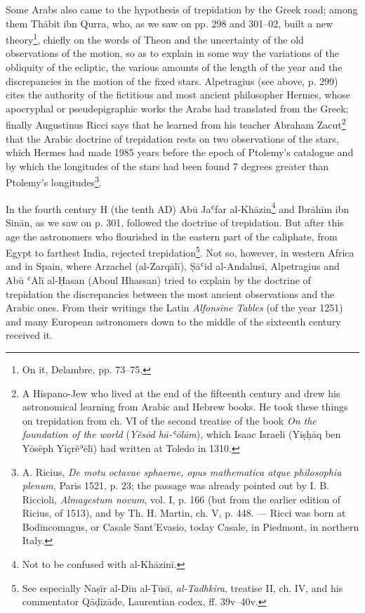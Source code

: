 \documentclass[11pt]{article}
\newcommand{\Pg}[1]{\marginpar{\footnotesize\color{gray}#1}}
\begin{document}
\par Some Arabs also came to the hypothesis of trepidation by the Greek road; among them Thābit ibn Qurra, who, as we saw on pp. 298 and 301–02, built a new theory\footnote{On it, Delambre, pp. 73–75.}, chiefly on the words of Theon and the uncertainty of the old observations of the motion, so as to explain in some way the variations of the obliquity of the ecliptic, the various amounts of the length of the year and the discrepancies in the motion of the fixed stars. Alpetragius (see above, p. 299) cites the authority of the fictitious and most ancient philosopher Hermes, whose apocryphal or pseudepigraphic works the Arabs had translated from the Greek; finally Augustinus Ricci says that he learned from his teacher Abraham Zacut\footnote{A Hispano-Jew who lived at the end of the fifteenth century and drew his astronomical learning from Arabic and Hebrew books. He took these things on trepidation from ch. VI of the second treatise of the book \emph{On the foundation of the world} (\emph{Yĕsōd hā-ʿōlām}), which Isaac Israeli (Yiṣḥāq ben Yōsēph Yiçrĕʾēlī) had written at Toledo in 1310.} that the Arabic doctrine of trepidation rests on two observations of the stars, which Hermes had made 1985 years before the epoch of Ptolemy's catalogue and by which the longitudes of the stars had been found 7 degrees greater than Ptolemy's longitudes\footnote{A. Ricius, \emph{De motu octavae sphaerae, opus mathematica atque philosophia plenum}, Paris 1521, p. 23; the passage was already pointed out by I. B. Riccioli, \emph{Almagestum novum}, vol. I, p. 166 (but from the earlier edition of Ricius, of 1513), and by Th. H. Martin, ch. V, p. 448. — Ricci was born at Bodincomagus, or Casale Sant'Evasio, today Casale, in Piedmont, in northern Italy.}.\par
\par \Pg{I 304}In the fourth century H (the tenth AD) Abū Jaʿfar al-Khāzin\footnote{Not to be confused with al-Khāzinī.} and Ibrāhīm ibn Sinān, as we saw on p. 301, followed the doctrine of trepidation. But after this age the astronomers who flourished in the eastern part of the caliphate, from Egypt to farthest India, rejected trepidation\footnote{See especially Naṣīr al-Dīn al-Ṭūsī, \emph{al-Tadhkira}, treatise II, ch. IV, and his commentator Qāḍīzāde, Laurentian codex, ff. 39v–40v.}. Not so, however, in western Africa and in Spain, where Arzachel (al-Zarqālī), Ṣāʿid al-Andalusī, Alpetragius and Abū ʿAlī al-Ḥasan (Aboul Hhassan) tried to explain by the doctrine of trepidation the discrepancies between the most ancient observations and the Arabic ones. From their writings the Latin \emph{Alfonsine Tables} (of the year 1251) and many European astronomers down to the middle of the sixteenth century received it.\par
\end{document}
